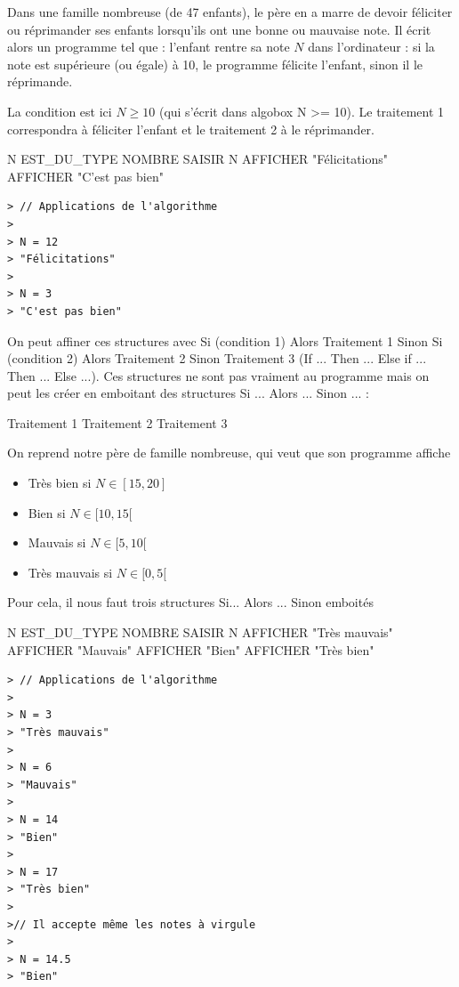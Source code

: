 \begin{exemple}
Dans une famille nombreuse (de 47 enfants), le père en a marre de devoir féliciter ou réprimander ses enfants lorsqu'ils ont une bonne ou mauvaise note. Il écrit alors un programme tel que : l'enfant rentre sa note $N$ dans l'ordinateur : si la note est supérieure (ou égale) à 10, le programme félicite l'enfant, sinon il le réprimande. \newline

La condition est ici $N \geq 10$ (qui s'écrit dans algobox N >= 10). Le traitement 1 correspondra à féliciter l'enfant et le traitement 2 à le réprimander.
\begin{algobox}
\Variables
\Ligne N EST\_DU\_TYPE NOMBRE
\DebutAlgo
\Ligne SAISIR N
\DebutSi
\Ligne AFFICHER "Félicitations"
\FinSi
\Sinon
\DebutSinon
\Ligne AFFICHER "C'est pas bien"
\FinSinon
\FinAlgo
\end{algobox}
\begin{verbatim}
> // Applications de l'algorithme
>
> N = 12
> "Félicitations"
>
> N = 3
> "C'est pas bien"
\end{verbatim}
\end{exemple}
On peut affiner ces structures avec Si (condition 1) Alors Traitement 1 Sinon Si (condition 2) Alors Traitement 2 Sinon Traitement 3 (If ... Then ... Else if ... Then ... Else ...). Ces structures ne sont pas vraiment au programme mais on peut les créer en emboitant des structures Si ... Alors ... Sinon ... : 
\begin{algobox}
\DebutAlgo
{}
\DebutSi
\Ligne Traitement 1
\FinSi
\Sinon
\DebutSinon
{}
\DebutSi
\Ligne Traitement 2
\FinSi
\Sinon
\DebutSinon
\Ligne Traitement 3
\FinSinon
\FinSinon
\FinAlgo

\end{algobox}
\begin{exemple}
On reprend notre père de famille nombreuse, qui veut que son programme affiche \begin{itemize} \item Très bien si $N \in [15,20]$ \item Bien si $N \in [10,15[$ \item Mauvais si $N \in [5,10[$ \item Très mauvais si $N \in [0,5[$\end{itemize} Pour cela, il nous faut trois structures Si... Alors ... Sinon emboités
\begin{algobox}
\Variables
\Ligne N EST\_DU\_TYPE NOMBRE
\DebutAlgo
\Ligne SAISIR N
\DebutSi
\Ligne AFFICHER "Très mauvais"
\FinSi
\Sinon
\DebutSinon
{}
\DebutSi
\Ligne AFFICHER "Mauvais"
\FinSi
\Sinon
\DebutSinon
{}
\DebutSi
\Ligne AFFICHER "Bien"
\FinSi
\Sinon
\DebutSinon
\Ligne AFFICHER "Très bien"
\FinSinon
\FinSinon
\FinSinon
\FinAlgo
\end{algobox}
\begin{verbatim}
> // Applications de l'algorithme
>
> N = 3
> "Très mauvais"
>
> N = 6
> "Mauvais"
>
> N = 14
> "Bien"
> 
> N = 17
> "Très bien"
>
>// Il accepte même les notes à virgule
>
> N = 14.5
> "Bien"
\end{verbatim}
\end{exemple}
